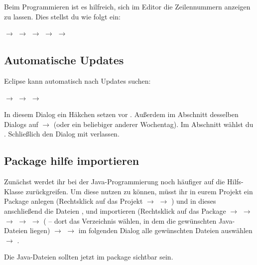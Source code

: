 Beim Programmieren ist es hilfreich, sich im Editor die Zeilennummern anzeigen
zu lassen. Dies stellst du wie folgt ein:

 $\rightarrow$  $\rightarrow$
 $\rightarrow$  $\rightarrow$  $\rightarrow$ 

\subsection{Automatische Updates} 

Eclipse kann automatisch nach Updates suchen:

 $\rightarrow$  $\rightarrow$
 $\rightarrow$  

In diesem Dialog ein Häkchen setzen vor . Außerdem im Abschnitt  desselben
Dialogs auf  $\rightarrow$
 (oder ein beliebiger anderer Wochentag). Im Abschnitt
 wählst du . Schließlich den Dialog mit
 verlassen.

\subsection{Package hilfe importieren}

Zunächst werdet ihr bei der Java-Programmierung noch häufiger auf die Hilfs-Klasse
 zurückgreifen. Um diese nutzen zu können, müsst ihr in eurem
Projekt ein Package  anlegen (Rechtsklick auf das Projekt
$\rightarrow$  $\rightarrow$ ) und in dieses
anschließend die Dateien  ,  und
 importieren (Rechtsklick auf das Package
$\rightarrow$  $\rightarrow$ 
$\rightarrow$  $\rightarrow$  $\rightarrow$
 ( -- dort das Verzeichnis wählen, in dem
die gewünschten Java-Dateien liegen) $\rightarrow$  $\rightarrow$
im folgenden Dialog alle gewünschten Dateien auswählen $\rightarrow$
.

Die Java-Dateien sollten jetzt im package  sichtbar sein.

